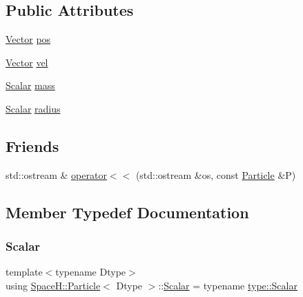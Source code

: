 \subsection*{Public Attributes}
\begin{DoxyCompactItemize}
\item 
\mbox{\hyperlink{struct_space_h_1_1_particle_afba20bb4c28d27263de384ba6a18f5c3}{Vector}} \mbox{\hyperlink{struct_space_h_1_1_particle_a8549632782c55a3f209e68b71572a771}{pos}}
\item 
\mbox{\hyperlink{struct_space_h_1_1_particle_afba20bb4c28d27263de384ba6a18f5c3}{Vector}} \mbox{\hyperlink{struct_space_h_1_1_particle_ae90b74768294374d2b97d4e537b48673}{vel}}
\item 
\mbox{\hyperlink{struct_space_h_1_1_particle_ab84dbb32b69069c6876698eec48cc984}{Scalar}} \mbox{\hyperlink{struct_space_h_1_1_particle_a642b596f6617a351de7def4fd814f48a}{mass}}
\item 
\mbox{\hyperlink{struct_space_h_1_1_particle_ab84dbb32b69069c6876698eec48cc984}{Scalar}} \mbox{\hyperlink{struct_space_h_1_1_particle_a7f6657c414053c18c3f8610acf69a519}{radius}}
\end{DoxyCompactItemize}
\subsection*{Friends}
\begin{DoxyCompactItemize}
\item 
std\+::ostream \& \mbox{\hyperlink{struct_space_h_1_1_particle_a2a1242332e0e6ddcf12e64645823d7c8}{operator$<$$<$}} (std\+::ostream \&os, const \mbox{\hyperlink{struct_space_h_1_1_particle}{Particle}} \&P)
\end{DoxyCompactItemize}


\subsection{Member Typedef Documentation}
\mbox{\label{struct_space_h_1_1_particle_ab84dbb32b69069c6876698eec48cc984}} 
\subsubsection{\texorpdfstring{Scalar}{Scalar}}
{\footnotesize\ttfamily template$<$typename Dtype$>$ \\
using \mbox{\hyperlink{struct_space_h_1_1_particle}{Space\+H\+::\+Particle}}$<$ Dtype $>$\+::\mbox{\hyperlink{struct_space_h_1_1_particle_ab84dbb32b69069c6876698eec48cc984}{Scalar}} =  typename \mbox{\hyperlink{struct_space_h_1_1_proto_type_af3c8245d83d9db64749882920de5c274}{type\+::\+Scalar}}}

